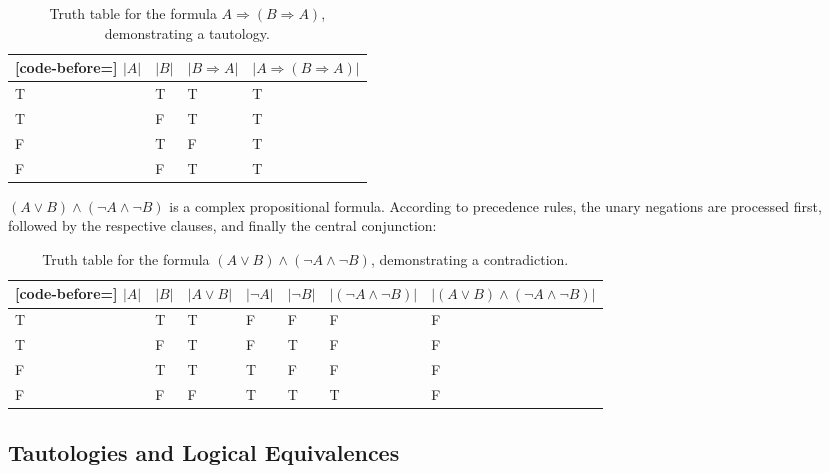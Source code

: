 \begin{examples}
\begin{exampleenumerate}
        \begin{table}[ht]
        \centering
        \begin{NiceTabularX}{.6\textwidth}{X[c]|X[c]|X[c]|X[2,c]}[code-before=]
            $|A|$ & $|B|$ & $|B \Rightarrow A|$ & $|A \Rightarrow (B \Rightarrow A)|$\\
            \hline
            T & T & T & T \\
            T & F & T & T \\
            F & T & F & T \\
            F & F & T & T \\
        \end{NiceTabularX}
        \caption{Truth table for the formula $A \Rightarrow (B \Rightarrow A)$, demonstrating a tautology.}\label{table:logic:tautology_example}
        \end{table}

        \item\label{example:logic:complex_conjunction} $(A \lor B) \land (\lnot A \land \lnot B)$ is a complex propositional formula. According to precedence rules, the unary negations are processed first, followed by the respective clauses, and finally the central conjunction:
        
        \begin{table}[ht]
        \centering
        \begin{NiceTabularX}{\textwidth}{X[c]|X[c]|X[c]|X[c]|X[c]|X[2,c]|X[3,c]}[code-before=]
            $|A|$ & $|B|$ & $|A \lor B|$ & $|\lnot A|$ & $|\lnot B|$ & $|(\lnot A \land \lnot B)|$ & $|(A \lor B) \land (\lnot A \land \lnot B)|$\\
            \hline
            T & T & T & F & F & F & F \\
            T & F & T & F & T & F & F \\
            F & T & T & T & F & F & F \\
            F & F & F & T & T & T & F \\
        \end{NiceTabularX}
        \caption{Truth table for the formula $(A \lor B) \land (\lnot A \land \lnot B)$, demonstrating a contradiction.}\label{table:logic:contradiction_example}
        \end{table}
    \end{exampleenumerate}
\end{examples}

\subsection{Tautologies and Logical Equivalences}

